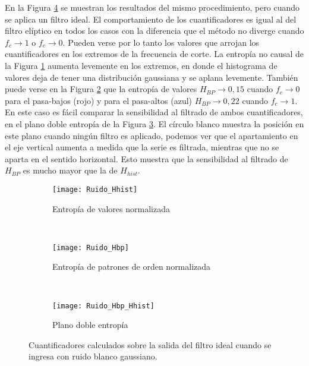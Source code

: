 En la Figura \ref{fig:ideal} se muestran los resultados del mismo procedimiento, pero cuando se aplica un filtro ideal.
El comportamiento de los cuantificadores es igual al del filtro elíptico en todos los casos con la diferencia que el método no diverge cuando $f_c\to1$ o $f_c\to0$.
Pueden verse por lo tanto los valores que arrojan los cuantificadores en los extremos de la frecuencia de corte.
La entropía no causal de la Figura \ref{subfig:ideal_Hhist} aumenta levemente en los extremos, en donde el histograma de valores deja de tener una distribución gaussiana y se aplana levemente.
También puede verse en la Figura \ref{subfig:ideal_Hbp} que la entropía de valores $H_{BP}\to0,15$ cuando $f_c\to0$ para el pasa-bajos (rojo) y para el pasa-altos (azul) $H_{BP}\to0,22$ cuando $f_c\to1$.
En este caso es fácil comparar la sensibilidad al filtrado de ambos cuantificadores, en el plano doble entropía de la Figura \ref{subfig:ideal_HbpHhist}.
El círculo blanco muestra la posición en este plano cuando ningún filtro es aplicado, podemos ver que el apartamiento en el eje vertical aumenta a medida que la serie es filtrada, mientras que no se aparta en el sentido horizontal.
Esto muestra que la sensibilidad al filtrado de $H_{BP}$ es mucho mayor que la de $H_{hist}$.
%
\begin{figure}[h]
    \centering
    \begin{subfigure}[t]{.49\textwidth}
        \texttt{[image: Ruido\_Hhist]}
        \caption{Entropía de valores normalizada}
        \label{subfig:ideal_Hhist}
    \end{subfigure}
    ~ %
    \begin{subfigure}[t]{.49\textwidth}
        \texttt{[image: Ruido\_Hbp]}
        \caption{Entropía de patrones de orden normalizada}
        \label{subfig:ideal_Hbp}
    \end{subfigure}
    ~ %
    \begin{subfigure}[t]{.49\textwidth}
        \texttt{[image: Ruido\_Hbp\_Hhist]}
        \caption{Plano doble entropía}
        \label{subfig:ideal_HbpHhist}
    \end{subfigure}
    \caption{Cuantificadores calculados sobre la salida del filtro ideal cuando se ingresa con ruido blanco gaussiano.}\label{fig:ideal}
\end{figure}

